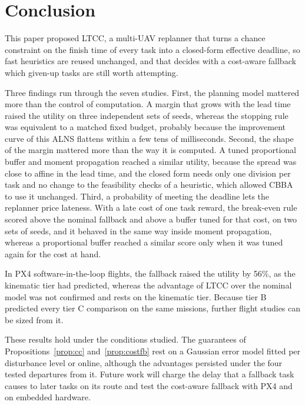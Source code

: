 \documentclass[a4paper,fleqn]{cas-dc}
\newcommand{\mname}{LTCC}  %
\newcounter{prop}
\begin{document}
\section{Conclusion}\label{sec:conclusion}\label{sec:discussion}
This paper proposed \mname{}, a multi-UAV replanner that turns a chance constraint on the finish time of every task
into a closed-form effective deadline, so fast heuristics are reused unchanged, and that decides with a cost-aware
fallback which given-up tasks are still worth attempting.

Three findings run through the seven studies. First, the planning model mattered more than the control of computation.
A margin that grows with the lead time raised the utility on three independent sets of seeds, whereas the stopping
rule was equivalent to a matched fixed budget, probably because the improvement curve of this ALNS flattens within a
few tens of milliseconds. Second, the shape of the margin mattered more than the way it is computed. A tuned
proportional buffer and moment propagation reached a similar utility, because the spread was close to affine in the
lead time, and the closed form needs only one division per task and no change to the feasibility checks of a
heuristic, which allowed CBBA to use it unchanged. Third, a probability of meeting the deadline lets the replanner
price lateness. With a late cost of one task reward, the break-even rule scored above the nominal fallback and above a
buffer tuned for that cost, on two sets of seeds, and it behaved in the same way inside moment propagation, whereas a
proportional buffer reached a similar score only when it was tuned again for the cost at hand.

In PX4 software-in-the-loop flights, the fallback raised the utility by 56\%, as the kinematic tier had
predicted, whereas the advantage of \mname{} over the nominal model was not confirmed and rests on the kinematic tier.
Because tier B predicted every tier C comparison on the same missions, further flight studies can be sized from it.

These results hold under the conditions studied. The guarantees of Propositions~\ref{prop:cc} and~\ref{prop:costfb}
rest on a Gaussian error model fitted per disturbance level or online, although the advantages persisted under the four
tested departures from it. Future work will charge the delay that a fallback task causes to later tasks on its route
and test the cost-aware fallback with PX4 and on embedded hardware.

\printcredits
\end{document}
